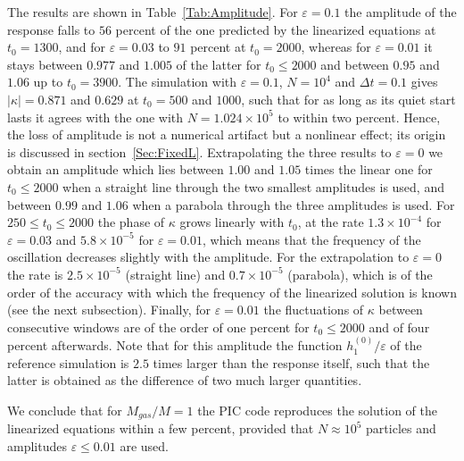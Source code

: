 The results are shown in Table~\ref{Tab:Amplitude}. For $\varepsilon = 0.1$ the amplitude of the response falls to $56$ percent of the one predicted by the linearized equations at $t_0 = 1300$, and for $\varepsilon = 0.03$ to $91$ percent at $t_0 = 2000$, whereas for $\varepsilon = 0.01$ it stays between $0.977$ and $1.005$ of the latter for $t_0\leq 2000$ and between $0.95$ and $1.06$ up to $t_0 = 3900$. The simulation with $\varepsilon = 0.1$, $N = 10^4$ and $\Delta t = 0.1$ gives $|\kappa| = 0.871$ and $0.629$ at $t_0 = 500$ and $1000$, such that for as long as its quiet start lasts it agrees with the one with $N = 1.024\times 10^5$ to within two percent. Hence, the loss of amplitude is not a numerical artifact but a nonlinear effect; its origin is discussed in section~\ref{Sec:FixedL}. Extrapolating the three results to $\varepsilon = 0$ we obtain an amplitude which lies between $1.00$ and $1.05$ times the linear one for $t_0\leq 2000$ when a straight line through the two smallest amplitudes is used, and between $0.99$ and $1.06$ when a parabola through the three amplitudes is used. For $250\leq t_0\leq 2000$ the phase of $\kappa$ grows linearly with $t_0$, at the rate $1.3\times 10^{-4}$ for $\varepsilon = 0.03$ and $5.8\times 10^{-5}$ for $\varepsilon = 0.01$, which means that the frequency of the oscillation decreases slightly with the amplitude. For the extrapolation to $\varepsilon = 0$ the rate is $2.5\times 10^{-5}$ (straight line) and $0.7\times 10^{-5}$ (parabola), which is of the order of the accuracy with which the frequency of the linearized solution is known (see the next subsection). Finally, for $\varepsilon = 0.01$ the fluctuations of $\kappa$ between consecutive windows are of the order of one percent for $t_0\leq 2000$ and of four percent afterwards. Note that for this amplitude the function $h_1^{(0)}/\varepsilon$ of the reference simulation is $2.5$ times larger than the response itself, such that the latter is obtained as the difference of two much larger quantities.

We conclude that for $M_{gas}/M = 1$ the PIC code reproduces the solution of the linearized equations within a few percent, provided that $N\approx 10^5$ particles and amplitudes $\varepsilon\leq 0.01$ are used. 


